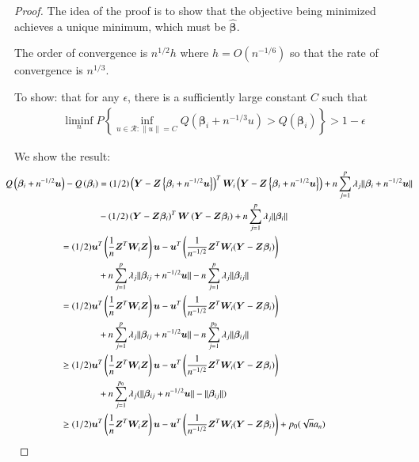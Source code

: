 \documentclass[authoryear, review, 11pt]{elsarticle}
\begin{document}
  \begin{proof}
    The idea of the proof is to show that the objective being minimized achieves a unique minimum, which must be $\hat{\bm{\beta}}$.
    
    The order of convergence is $n^{1/2} h$ where $h = O(n^{-1/6})$ so that the rate of convergence is $n^{1/3}$.
    
    To show: that for any $\epsilon$, there is a sufficiently large constant $C$ such that
    \begin{align*}
      \liminf \limits_n P \left\{ \inf_{u \in \mathcal{R}: \|u\| = C} Q \left( \bm{\beta}_i + n^{-1/3} u \right) > Q \left( \bm{\beta}_i \right) \right\} > 1 - \epsilon
    \end{align*}
    
    We show the result:
    \begin{align}\label{eq:consistency}
      \mkern-18mu Q \left( \bm{\beta}_i + n^{-1/2} \bm{u} \right) - Q \left( \bm{\beta}_i \right) &= (1/2) \left( \bm{Y} - \bm{Z} \left\{ \bm{\beta}_i + n^{-1/2} \bm{u} \right\} \right)^T \bm{W}_i \left( \bm{Y} - \bm{Z} \left\{ \bm{\beta}_i + n^{-1/2} \bm{u} \right\} \right) + n \sum_{j=1}^p \lambda_j \| \bm{\beta}_i + n^{-1/2} \bm{u} \| \notag \\
      &- (1/2) \left( \bm{Y} - \bm{Z} \bm{\beta}_i \right)^T \bm{W} \left( \bm{Y} - \bm{Z} \bm{\beta}_i \right) + n \sum_{j=1}^p \lambda_j \| \bm{\beta}_i \| \notag \\ 
      &\mkern-72mu= (1/2) \bm{u}^T \left( \frac{1}{n} \bm{Z}^T \bm{W}_i \bm{Z} \right) \bm{u} - \bm{u}^T \left( \frac{1}{n^{-1/2}} \bm{Z}^T \bm{W}_i (\bm{Y} - \bm{Z} \bm{\beta}_i) \right) \notag \\
      &+ n \sum_{j=1}^p \lambda_j \|\bm{\beta}_{ij} + n^{-1/2} \bm{u} \| - n \sum_{j=1}^p \lambda_j \| \bm{\beta}_{ij} \| \notag \\
      &\mkern-72mu= (1/2) \bm{u}^T \left( \frac{1}{n} \bm{Z}^T \bm{W}_i \bm{Z} \right) \bm{u} - \bm{u}^T \left( \frac{1}{n^{-1/2}} \bm{Z}^T \bm{W}_i (\bm{Y} - \bm{Z} \bm{\beta}_i) \right) \notag \\
      &+ n \sum_{j=1}^p \lambda_j \|\bm{\beta}_{ij} + n^{-1/2} \bm{u} \| - n \sum_{j=1}^{p_0} \lambda_j \| \bm{\beta}_{ij} \| \notag \\
      &\mkern-72mu\ge (1/2) \bm{u}^T \left( \frac{1}{n} \bm{Z}^T \bm{W}_i \bm{Z} \right) \bm{u} - \bm{u}^T \left( \frac{1}{n^{-1/2}} \bm{Z}^T \bm{W}_i (\bm{Y} - \bm{Z} \bm{\beta}_i) \right) \notag \\
      &+ n \sum_{j=1}^{p_0} \lambda_j ( \|\bm{\beta}_{ij} + n^{-1/2} \bm{u} \| - \| \bm{\beta}_{ij} \| ) \notag \\
      &\mkern-72mu\ge (1/2) \bm{u}^T \left( \frac{1}{n} \bm{Z}^T \bm{W}_i \bm{Z} \right) \bm{u} - \bm{u}^T \left( \frac{1}{n^{-1/2}} \bm{Z}^T \bm{W}_i (\bm{Y} - \bm{Z} \bm{\beta}_i) \right) + p_0 ( \sqrt{n} a_n )
    \end{align}
  \end{proof}
\end{document}
